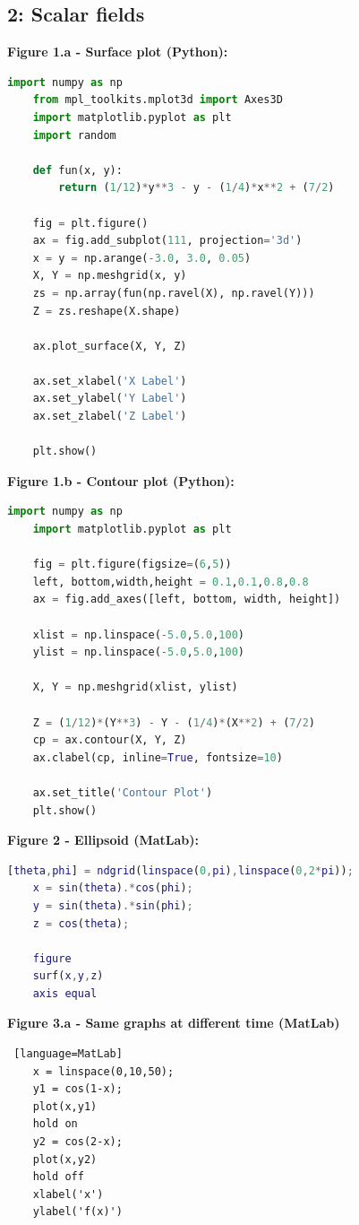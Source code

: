\documentclass[10pt,a4paper]{article}
\begin{document}
\subsection{2: Scalar fields}

\textbf{Figure 1.a - Surface plot (Python):} 
\begin{lstlisting}[language=Python]
    import numpy as np
    from mpl_toolkits.mplot3d import Axes3D  
    import matplotlib.pyplot as plt
    import random

    def fun(x, y):
        return (1/12)*y**3 - y - (1/4)*x**2 + (7/2)

    fig = plt.figure()
    ax = fig.add_subplot(111, projection='3d')
    x = y = np.arange(-3.0, 3.0, 0.05)
    X, Y = np.meshgrid(x, y)
    zs = np.array(fun(np.ravel(X), np.ravel(Y)))
    Z = zs.reshape(X.shape)

    ax.plot_surface(X, Y, Z)

    ax.set_xlabel('X Label')
    ax.set_ylabel('Y Label')
    ax.set_zlabel('Z Label')

    plt.show()
\end{lstlisting}

\textbf{Figure 1.b - Contour plot (Python):} 
\begin{lstlisting}[language=Python]
    import numpy as np
    import matplotlib.pyplot as plt
    
    fig = plt.figure(figsize=(6,5))
    left, bottom,width,height = 0.1,0.1,0.8,0.8
    ax = fig.add_axes([left, bottom, width, height])
    
    xlist = np.linspace(-5.0,5.0,100)
    ylist = np.linspace(-5.0,5.0,100)
    
    X, Y = np.meshgrid(xlist, ylist)
    
    Z = (1/12)*(Y**3) - Y - (1/4)*(X**2) + (7/2)
    cp = ax.contour(X, Y, Z)
    ax.clabel(cp, inline=True, fontsize=10)
    
    ax.set_title('Contour Plot')
    plt.show()
\end{lstlisting}
\pagebreak
\textbf{Figure 2 - Ellipsoid (MatLab):} 
\begin{lstlisting}[language=MatLab]
    [theta,phi] = ndgrid(linspace(0,pi),linspace(0,2*pi));
    x = sin(theta).*cos(phi);
    y = sin(theta).*sin(phi);
    z = cos(theta);

    figure
    surf(x,y,z)
    axis equal
\end{lstlisting}

\textbf{Figure 3.a -  Same graphs at different time (MatLab)} 
\begin{lstlisting} [language=MatLab]
    x = linspace(0,10,50);
    y1 = cos(1-x);
    plot(x,y1)
    hold on
    y2 = cos(2-x);
    plot(x,y2)
    hold off
    xlabel('x') 
    ylabel('f(x)') 
\end{lstlisting}
\end{document}
